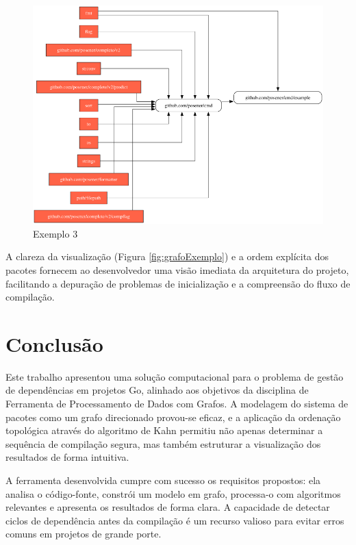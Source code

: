 \documentclass[12pt]{article}
\begin{document}
\begin{figure}[ht]
\centering
\includegraphics[width=1\textwidth]{examples/github.com_posener_cmd.png}
\caption{Exemplo 3}
\label{fig:exemplo-3}
\end{figure}

A clareza da visualização (Figura \ref{fig:grafoExemplo}) e a ordem explícita dos pacotes fornecem ao desenvolvedor uma visão imediata da arquitetura do projeto, facilitando a depuração de problemas de inicialização e a compreensão do fluxo de compilação.

\section{Conclusão}

Este trabalho apresentou uma solução computacional para o problema de gestão de dependências em projetos Go, alinhado aos objetivos da disciplina de Ferramenta de Processamento de Dados com Grafos. A modelagem do sistema de pacotes como um grafo direcionado provou-se eficaz, e a aplicação da ordenação topológica através do algoritmo de Kahn \cite{kahn1962} permitiu não apenas determinar a sequência de compilação segura, mas também estruturar a visualização dos resultados de forma intuitiva.

A ferramenta desenvolvida cumpre com sucesso os requisitos propostos: ela analisa o código-fonte, constrói um modelo em grafo, processa-o com algoritmos relevantes e apresenta os resultados de forma clara. A capacidade de detectar ciclos de dependência antes da compilação é um recurso valioso para evitar erros comuns em projetos de grande porte.
\end{document}
